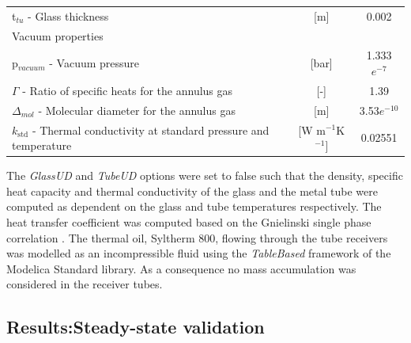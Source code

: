 \documentclass[final,3p,times,review]{elsarticle}
\begin{document}
\begin{table}[h]
\begin{tabularx}{\textwidth}{Xcc}
   \hspace*{0.3cm} t$_{tu}$ - Glass thickness  & [m] & 0.002\\
    Vacuum properties &  &  \\
   \hspace*{0.3cm} p$_{vacuum}$ - Vacuum pressure & [bar] & 1.333$e^{-7}$\\
   \hspace*{0.3cm} $\Gamma$ - Ratio of specific heats for the annulus gas & [-] & 1.39\\
   \hspace*{0.3cm} $\Delta_{mol}$ - Molecular diameter for the annulus gas & [m] & 3.53$e^{-10}$\\
   \hspace*{0.3cm} $k_\mathrm{std}$ - Thermal conductivity at standard pressure and temperature & [W m$^{-1}$K$^{-1}$] & 0.02551\\
    \bottomrule
    \end{tabularx}%
  \label{tab:SF_parameter}%
\end{table}%
%
The \textit{GlassUD} and \textit{TubeUD} options were set to false such that the density, specific heat capacity and thermal conductivity of the glass and the metal tube were computed as dependent on the glass and tube temperatures respectively.
The heat transfer coefficient was computed based on the Gnielinski single phase correlation \cite{Gnielinski2010}.
The thermal oil, Syltherm 800, flowing through the tube receivers was modelled as an incompressible fluid using the \textit{TableBased} framework of the Modelica Standard library. As a consequence no mass accumulation was considered in the receiver tubes.


%
\subsection{Results:Steady-state validation}
%
\end{document}
